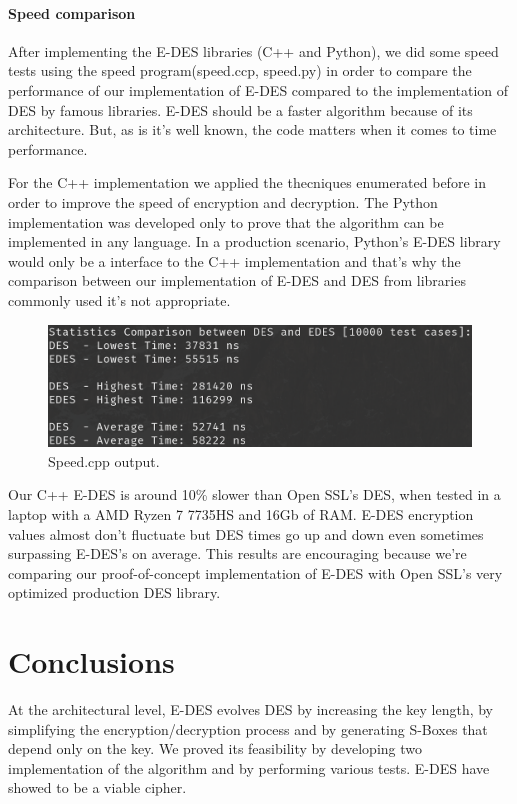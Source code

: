 \documentclass{article} %
\begin{document}
\paragraph{Speed comparison}

After implementing the E-DES libraries (C++ and Python), we did some speed tests using the speed program(speed.ccp, speed.py) in order to compare the performance of our implementation
of E-DES compared to the implementation of DES by famous libraries. E-DES should be a faster algorithm because of its architecture. But, as is it's well known, the code matters
when it comes to time performance.

For the C++ implementation we applied the thecniques enumerated before in order to improve the speed of encryption and decryption. The Python implementation was developed only to prove that
the algorithm can be implemented in any language. In a production scenario, Python's E-DES library would only be a interface to the C++ implementation and that's  why the comparison
between our implementation of E-DES and DES from libraries commonly used it's not appropriate.

\begin{figure}[h]
  \center
  \includegraphics[scale=0.2]{assets/speed.png}
  \caption{Speed.cpp output.}
\end{figure}

Our C++ E-DES is around 10\% slower than Open SSL's DES, when tested in a laptop with a AMD Ryzen 7 7735HS and 16Gb of RAM. E-DES encryption values almost don't fluctuate but
DES times go up and down even sometimes surpassing E-DES's on average. This results are encouraging because we're comparing our proof-of-concept implementation of E-DES with Open 
SSL's very optimized production DES library.

\section{Conclusions}

At the architectural level, E-DES evolves DES by increasing the key length, by simplifying the encryption/decryption process and by generating S-Boxes that depend only
on the key. We proved its feasibility by developing two implementation of the algorithm and by performing various tests. E-DES have showed to be 
a viable cipher.
\end{document}
